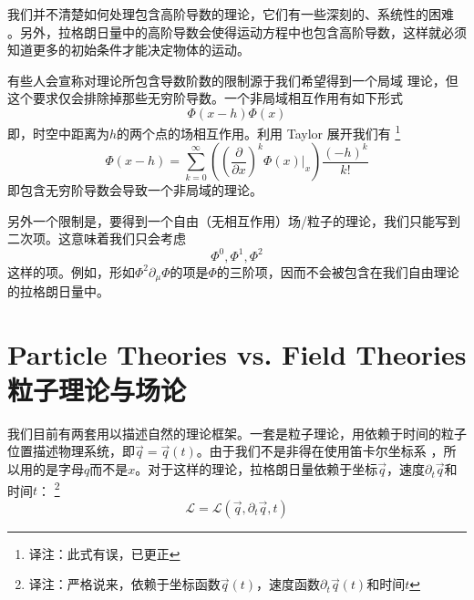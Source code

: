 我们并不清楚如何处理包含高阶导数的理论，它们有一些深刻的、系统性的困难%
%
。另外，拉格朗日量中的高阶导数会使得运动方程中也包含高阶导数，这样就必须知道更多的初始条件才能决定物体的运动。

有些人会宣称对理论所包含导数阶数的限制源于我们希望得到一个局域%
%
理论，但这个要求仅会排除掉那些无穷阶导数。一个非局域相互作用有如下形式%
\begin{equation}
\Phi(x-h)\Phi(x)
\end{equation}
即，时空中距离为\(h\)的两个点的场相互作用。利用 Taylor 展开我们有%
\footnote{译注：此式有误，已更正}
\begin{equation}
\Phi(x-h) = \sum\limits_{k=0}^{\infty}\left(\left(\frac{\partial}{\partial x}\right)^k\left.\Phi(x)\right|_{x}\right) \frac{(-h)^k}{k!}
\end{equation}
即包含无穷阶导数会导致一个非局域的理论。

另外一个限制是，要得到一个自由（无相互作用）场/粒子的理论，我们只能写到二次项。这意味着我们只会考虑%
\[
\Phi^0, \Phi^1, \Phi^2
\]
这样的项。例如，形如\(\Phi^2 \partial_\mu \Phi\)的项是\(\Phi\)的三阶项，因而不会被包含在我们自由理论的拉格朗日量中。

\section[粒子理论与场论]{Particle Theories vs. Field Theories \quad 粒子理论与场论}\label{sec4.3}
我们目前有两套用以描述自然的理论框架。一套是粒子理论，用依赖于时间的粒子位置描述物理系统，即\(\vec{q}=\vec{q}(t)\)。由于我们不是非得在使用笛卡尔坐标系%
%
，所以用的是字母\(q\)而不是\(x\)。对于这样的理论，拉格朗日量依赖于坐标\(\vec{q}\)，速度\(\partial_t\vec{q}\)和时间\(t\)：%
\footnote{译注：严格说来，依赖于坐标函数\(\vec{q}(t)\)，速度函数\(\partial_t\vec{q}(t)\)和时间\(t\)}
\begin{equation}
{\mathcal L} = {\mathcal L} (\vec{q},\partial_t\vec{q},t)
\end{equation}

